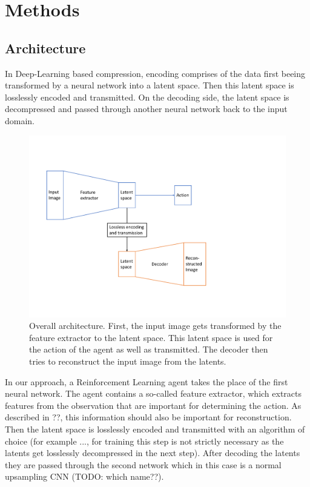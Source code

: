 \section{Methods}

\subsection{Architecture}\label{methods:Architecture}
    In Deep-Learning based compression, encoding comprises of the data first
    beeing transformed by a neural network into a latent space. Then this latent
    space is losslessly encoded and transmitted. On the decoding side, the
    latent space is decompressed and passed through another neural network back
    to the input domain.

    \begin{figure}
        \includegraphics[width=\linewidth]{img/architecture.pdf}
        \caption{Overall architecture. First, the input image gets transformed by the feature extractor to the latent space. This latent space is used for the action of the agent as well as transmitted. The decoder then tries to reconstruct the input image from the latents.}
    \end{figure}

    In our approach, a Reinforcement Learning agent takes the place of the first
    neural network. The agent contains a so-called feature extractor, which
    extracts features from the observation that are important for determining
    the action. As described in ??, this information should also be important
    for reconstruction. Then the latent space is losslessly encoded and
    transmitted with an algorithm of choice (for example ..., for training this
    step is not strictly necessary as the latents get losslessly decompressed in
    the next step). After decoding the latents they are passed through the
    second network which in this case is a normal upsampling CNN (TODO: which name??). 

